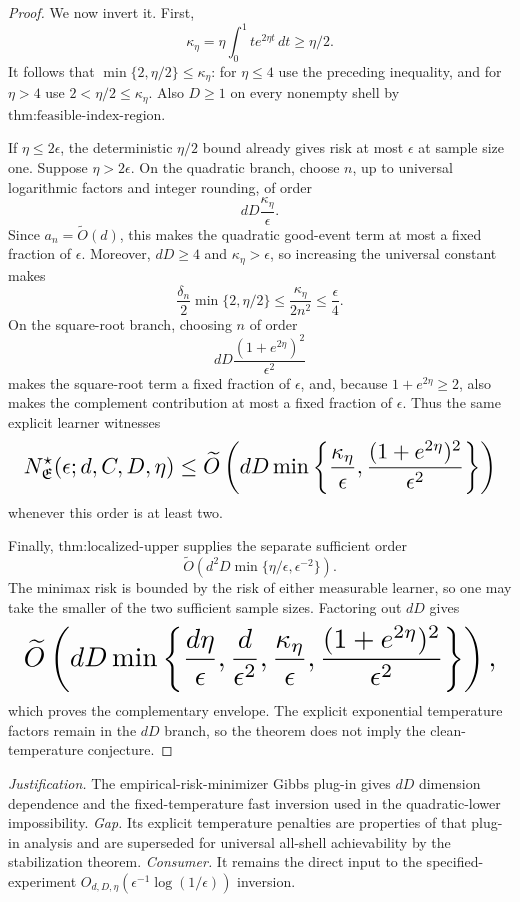 \documentclass{article}
\begin{document}
\begin{proof}
We now invert it. First,
\[
\kappa_\eta=\eta\int_0^1t e^{2\eta t}\,dt\ge\eta/2.
\]
It follows that \(\min\{2,\eta/2\}\le\kappa_\eta\): for \(\eta\le4\) use the preceding inequality, and for \(\eta>4\) use \(2<\eta/2\le\kappa_\eta\). Also \(D\ge1\) on every nonempty shell by \(\text{thm:feasible-index-region}\).

If \(\eta\le2\epsilon\), the deterministic \(\eta/2\) bound already gives risk at most \(\epsilon\) at sample size one. Suppose \(\eta>2\epsilon\). On the quadratic branch, choose \(n\), up to universal logarithmic factors and integer rounding, of order
\[
dD\frac{\kappa_\eta}{\epsilon}.
\]
Since \(a_n=\widetilde O(d)\), this makes the quadratic good-event term at most a fixed fraction of \(\epsilon\). Moreover, \(dD\ge4\) and \(\kappa_\eta>\epsilon\), so increasing the universal constant makes
\[
\frac{\delta_n}{2}\min\{2,\eta/2\}
\le\frac{\kappa_\eta}{2n^2}
\le\frac\epsilon4.
\]
On the square-root branch, choosing \(n\) of order
\[
dD\frac{(1+e^{2\eta})^2}{\epsilon^2}
\]
makes the square-root term a fixed fraction of \(\epsilon\), and, because \(1+e^{2\eta}\ge2\), also makes the complement contribution at most a fixed fraction of \(\epsilon\). Thus the same explicit learner witnesses
\[
\makebox[\linewidth][c]{\resizebox{0.98\linewidth}{!}{\(\displaystyle N^\star_{\mathfrak E}(\epsilon;d,C,D,\eta)
\le\widetilde O\left(
 dD\min\left\{
 \frac{\kappa_\eta}{\epsilon},
 \frac{(1+e^{2\eta})^2}{\epsilon^2}
 \right\}
\right)\)}}
\]
whenever this order is at least two.

Finally, \(\text{thm:localized-upper}\) supplies the separate sufficient order
\[
\widetilde O\left(d^2D\min\{\eta/\epsilon,\epsilon^{-2}\}\right).
\]
The minimax risk is bounded by the risk of either measurable learner, so one may take the smaller of the two sufficient sample sizes. Factoring out \(dD\) gives
\[
\makebox[\linewidth][c]{\resizebox{0.98\linewidth}{!}{\(\displaystyle \widetilde O\left(
 dD\min\left\{
 \frac{d\eta}{\epsilon},
 \frac d{\epsilon^2},
 \frac{\kappa_\eta}{\epsilon},
 \frac{(1+e^{2\eta})^2}{\epsilon^2}
 \right\}
\right),\)}}
\]
which proves the complementary envelope. The explicit exponential temperature factors remain in the \(dD\) branch, so the theorem does not imply the clean-temperature conjecture.
\end{proof}
\par\smallskip\noindent \textit{Justification.} The empirical-risk-minimizer Gibbs plug-in gives \(dD\) dimension dependence and the fixed-temperature fast inversion used in the quadratic-lower impossibility. \textit{Gap.} Its explicit temperature penalties are properties of that plug-in analysis and are superseded for universal all-shell achievability by the stabilization theorem. \textit{Consumer.} It remains the direct input to the specified-experiment \(O_{d,D,\eta}(\epsilon^{-1}\log(1/\epsilon))\) inversion.
\end{document}
